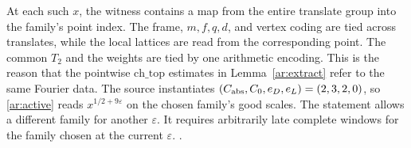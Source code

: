 At each such \(x\), the witness contains a map from the entire translate group into the family's point index. The frame, \(m,f,q,d\), and vertex coding are tied across translates, while the local lattices are read from the corresponding point. The common \(T_2\) and the weights are tied by one arithmetic encoding. This is the reason that the pointwise \(\mathrm{ch\_top}\) estimates in Lemma~\ref{ar:extract} refer to the same Fourier data. The source instantiates \((C_{\rm abs},C_0,e_D,e_L)=(2,3,2,0)\), so \eqref{ar:active} reads \(x^{1/2+9\varepsilon}\) on the chosen family's good scales. The statement allows a different family for another \(\varepsilon\). It requires arbitrarily late complete windows for the family chosen at the current \(\varepsilon\). \quad
{}\quad
{}\quad
{}.

